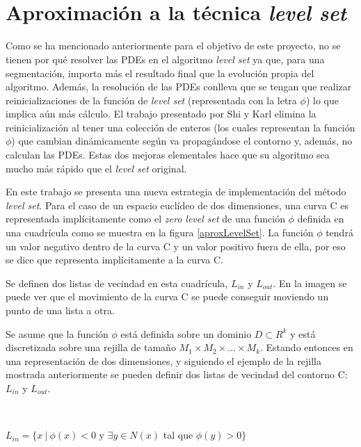 \

\

\section{Aproximaci\'{o}n a la t\'{e}cnica \textit{level set}}

Como se ha mencionado anteriormente para el objetivo de este proyecto, no se tienen por qu\'{e} resolver las PDEs en el algoritmo \textit{level set} ya que, para una segmentaci\'{o}n, importa m\'{a}s el resultado final que la evoluci\'{o}n propia del algoritmo. Adem\'{a}s, la resoluci\'{o}n de las PDEs conlleva que se tengan que realizar reinicializaciones de la funci\'{o}n de \textit{level set} (representada con la letra $\phi$) lo que implica a\'{u}n m\'{a}s c\'{a}lculo. El trabajo presentado por Shi y Karl \cite{yong1} elimina la reinicializaci\'{o}n al tener una colecci\'{o}n de enteros (los cuales representan la funci\'{o}n $\phi$) que cambian din\'{a}micamente seg\'{u}n va propag\'{a}ndose el contorno y, adem\'{a}s, no calculan las PDEs. Estas dos mejoras elementales hace que su algoritmo sea mucho m\'{a}s r\'{a}pido que el \textit{level set} original. 

En este trabajo se presenta una nueva estrategia de implementaci\'{o}n del m\'{e}todo \textit{level set}. Para el caso de un espacio eucl\'{i}deo de dos dimensiones, una curva C es representada impl\'{i}citamente como el \textit{zero level set} de una funci\'{o}n $\phi$ definida en una cuadr\'{i}cula como se muestra en la figura \ref{aproxLevelSet}. La funci\'{o}n $\phi$ tendr\'{a} un valor negativo dentro de la curva C y un valor positivo fuera de ella, por eso se dice que representa impl\'{i}citamente a la curva C. 

Se definen dos listas de vecindad en esta cuadr\'{i}cula, $L_{in}$ y $L_{out}$. En la imagen se puede ver que el movimiento de la curva C se puede conseguir moviendo un punto de una lista a otra.

Se asume que la funci\'{o}n $\phi$ est\'{a} definida sobre un dominio $D \subset R^k$ y est\'{a} discretizada sobre una rejilla de tama\~{n}o $M_1 \times M_2 \times ... \times M_k$. Estando entonces en una representaci\'{o}n de dos dimensiones, y siguiendo el ejemplo de la rejilla mostrada anteriormente se pueden definir dos listas de vecindad del contorno C: $L_{in}$ y $L_{out}$.

\

$L_{in} = \{x \ | \ \phi(x) < 0$ y $  \exists y \in N(x)$ tal que $\phi(y) > 0\}$

